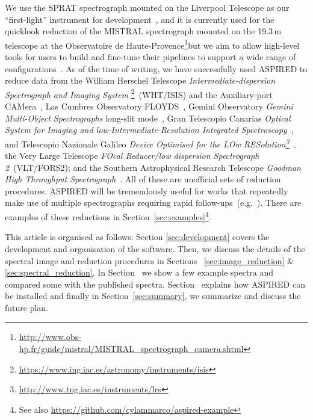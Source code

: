 \documentclass[linenumbers, twocolumn]{aastex631}
\begin{document}
We use the SPRAT spectrograph mounted on the Liverpool Telescope as our
``first-light'' instrument for development~\citep{2014SPIE.9147E..8HP}, and it
is currently used for the quicklook reduction of the MISTRAL spectrograph
mounted on the 19.3\,m telescope at the Observatoire de
Haute-Provence\footnote{\url{http://www.obs-hp.fr/guide/mistral/MISTRAL_spectrograph_camera.shtml}}but we
aim to allow high-level tools for users to build and fine-tune their pipelines
to support a wide range of
configurations~\citep{2020arXiv201203505L, marco_2021_4463569}. As of the time
of writing, we have successfully used \textsc{ASPIRED} to reduce data from the
William Herschel Telescope \textit{Intermediate-dispersion Spectrograph and
Imaging System} \footnote{\url{https://www.ing.iac.es/astronomy/instruments/isis}}~(WHT/ISIS)
and the Auxiliary-port CAMera~\citep[ACAM;][]{2008SPIE.7014E..6XB}, Las Cumbres
Observatory FLOYDS~\citep[LCO/FLOYDS;][]{2013PASP..125.1031B}, Gemini Observatory
\textit{Gemini Multi-Object Spectrographs} long-slit
mode~\citep[Gemini/GMOS-LS;][]{2004PASP..116..425H}, Gran Telescopio Canarias
\textit{Optical System for Imaging and low-Intermediate-Resolution Integrated
Spectroscopy}~\citep[GTC/OSIRIS;][]{2000SPIE.4008..623C}, and Telescopio
Nazionale Galileo \textit{Device Optimised for the LOw
RESolution\footnote{\url{http://www.tng.iac.es/instruments/lrs}}}~\citep[TNG/DOLORES;][]{1999ldss.work..157M},
the Very Large Telescope \textit{FOcal Reducer/low dispersion Spectrograph 2}~(VLT/FORS2); and the Southern Astrophysical Research Telescope \textit{Goodman High Throughput Spectrograph}~\citep[SOAR/GHTS][]{2004SPIE.5492..331C}.
All of these are unofficial sets of reduction procedures. \textsc{ASPIRED}
will be tremendously useful for works that repeatedly make use of multiple
spectrographs requiring rapid follow-ups~(e.g.\ \citealp{2022A&A...657A..17B}).
There are examples of these reductions in Section~\ref{sec:examples}\footnote{See
also \url{https://github.com/cylammarco/aspired-example}}.

This article is organised as follows: Section \textsection\ref{sec:development}
covers the development and organisation of the software. Then, we discuss the
details of the spectral image and reduction procedures in Sections~\textsection
\ref{sec:image_reduction} \& \ref{sec:spectral_reduction}. In
Section~\textsection{\ref{sec:examples}} we show a few example spectra and
compared some with the published spectra.
Section~\textsection{\ref{sec:distribution}}
explains how \textsc{ASPIRED} can be installed and finally in 
Section~\textsection\ref{sec:summary}, we summarize and discuss the future
plan.
\end{document}
